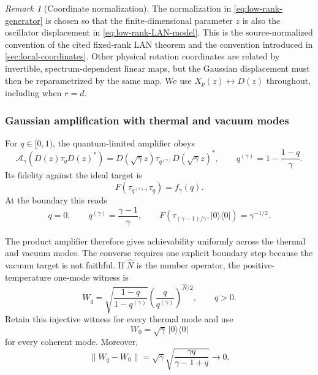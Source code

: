 \documentclass[11pt]{article}
\theoremstyle{remark}
\newtheorem{remark}[remark]{Remark}
\theoremstyle{plain}
\newcommand{\cA}{\mathcal A}
\newcommand{\proj}[1]{|#1\rangle\!\langle #1|}
\begin{document}
\begin{remark}[Coordinate normalization]
\label{rem:fixed-rank-coordinate}
The normalization in \eqref{eq:low-rank-generator} is chosen so that the
finite-dimensional parameter \(z\) is also the oscillator displacement in
\eqref{eq:low-rank-LAN-model}.  This is the source-normalized convention of
the cited fixed-rank LAN theorem and the convention introduced in
\cref{sec:local-coordinates}.  Other physical rotation coordinates are
related by invertible, spectrum-dependent linear maps, but the Gaussian
displacement must then be reparametrized by the same map.  We use
\(X_p(z)\leftrightarrow D(z)\) throughout, including when \(r=d\).
\end{remark}

\subsubsection{Gaussian amplification with thermal and vacuum modes}

For \(q\in[0,1)\), the quantum-limited amplifier obeys
\[
  \cA_\gamma(D(z)\tau_qD(z)^*)
  =D(\sqrt\gamma z)\tau_{q^{(\gamma)}}D(\sqrt\gamma z)^*,
  \qquad
  q^{(\gamma)}=1-\frac{1-q}{\gamma}.
\]
Its fidelity against the ideal target is
\[
  F(\tau_{q^{(\gamma)}},\tau_q)=f_\gamma(q).
\]
At the boundary this reads
\[
  q=0,
  \qquad q^{(\gamma)}=\frac{\gamma-1}{\gamma},
  \qquad F(\tau_{(\gamma-1)/\gamma},\proj0)=\gamma^{-1/2}.
\]

The product amplifier therefore gives achievability uniformly across the
thermal and vacuum modes.  The converse requires one explicit boundary
step because the vacuum target is not faithful.  If \(\widehat N\) is the
number operator, the positive-temperature one-mode witness is
\[
  W_q=
  \sqrt{\frac{1-q}{1-q^{(\gamma)}}}
  \left(\frac{q}{q^{(\gamma)}}\right)^{\widehat N/2},
  \qquad q>0.
\]
Retain this injective witness for every thermal mode and use
\[
  W_0=\sqrt\gamma\,\proj0
\]
for every coherent mode.  Moreover,
\begin{equation}
  \|W_q-W_0\|
  =\sqrt\gamma
   \sqrt{\frac{\gamma q}{\gamma-1+q}}
  \longrightarrow0.
  \label{eq:witness-boundary-continuity}
\end{equation}
\end{document}
